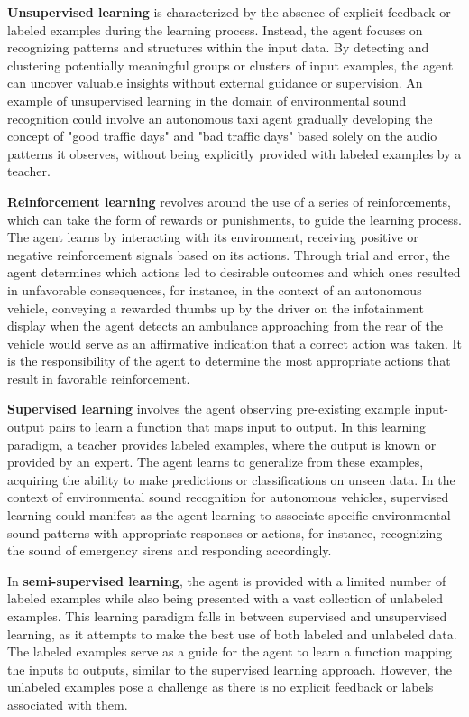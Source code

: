 \textbf{Unsupervised learning} is characterized by the absence of explicit feedback or labeled examples during the learning process. Instead, the agent focuses on recognizing patterns and structures within the input data. By detecting and clustering potentially meaningful groups or clusters of input examples, the agent can uncover valuable insights without external guidance or supervision. An example of unsupervised learning in the domain of environmental sound recognition could involve an autonomous taxi agent gradually developing the concept of "good traffic days" and "bad traffic days" based solely on the audio patterns it observes, without being explicitly provided with labeled examples by a teacher.

\textbf{Reinforcement learning} revolves around the use of a series of reinforcements, which can take the form of rewards or punishments, to guide the learning process. The agent learns by interacting with its environment, receiving positive or negative reinforcement signals based on its actions. Through trial and error, the agent determines which actions led to desirable outcomes and which ones resulted in unfavorable consequences, for instance, in the context of an autonomous vehicle, conveying a rewarded thumbs up by the driver on the infotainment display when the agent detects an ambulance approaching from the rear of the vehicle would serve as an affirmative indication that a correct action was taken. It is the responsibility of the agent to determine the most appropriate actions that result in favorable reinforcement.

\textbf{Supervised learning} involves the agent observing pre-existing example input-output pairs to learn a function that maps input to output. In this learning paradigm, a teacher provides labeled examples, where the output is known or provided by an expert. The agent learns to generalize from these examples, acquiring the ability to make predictions or classifications on unseen data. In the context of environmental sound recognition for autonomous vehicles, supervised learning could manifest as the agent learning to associate specific environmental sound patterns with appropriate responses or actions, for instance, recognizing the sound of emergency sirens and responding accordingly.

In \textbf{semi-supervised learning}, the agent is provided with a limited number of labeled examples while also being presented with a vast collection of unlabeled examples. This learning paradigm falls in between supervised and unsupervised learning, as it attempts to make the best use of both labeled and unlabeled data. The labeled examples serve as a guide for the agent to learn a function mapping the inputs to outputs, similar to the supervised learning approach. However, the unlabeled examples pose a challenge as there is no explicit feedback or labels associated with them.

